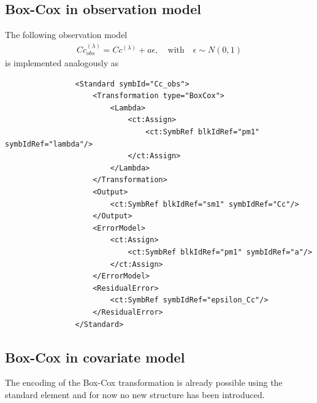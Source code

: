 \subsection{Box-Cox in observation model}
The following observation model 
\begin{align*}
        Cc_{obs}^{(\lambda)} = Cc^{(\lambda)} + a \epsilon, \quad \text{with} \quad \epsilon \sim N(0,1)
\end{align*}
is implemented analogously as 
\lstset{language=XML}
\begin{lstlisting}
                <Standard symbId="Cc_obs">
                    <Transformation type="BoxCox">
                        <Lambda>
                            <ct:Assign>
                                <ct:SymbRef blkIdRef="pm1" symbIdRef="lambda"/>
                            </ct:Assign>
                        </Lambda>
                    </Transformation>
                    <Output>
                        <ct:SymbRef blkIdRef="sm1" symbIdRef="Cc"/>
                    </Output>
                    <ErrorModel>
                        <ct:Assign>
                            <ct:SymbRef blkIdRef="pm1" symbIdRef="a"/>
                        </ct:Assign>
                    </ErrorModel>
                    <ResidualError>
                        <ct:SymbRef symbIdRef="epsilon_Cc"/>
                    </ResidualError>
                </Standard>
\end{lstlisting}


\subsection{Box-Cox in covariate model}
The encoding of the Box-Cox transformation is already possible using the
standard  element and for now no new structure has been introduced.



